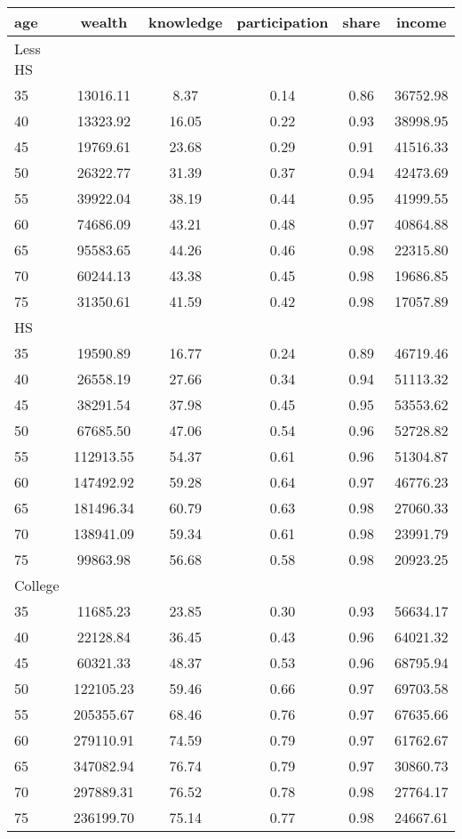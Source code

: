  \begin{tabular}{lccccc}
 \hline \hline
  age & wealth & knowledge & participation & share & income \\
 \hline
 Less HS & & & & & \\
 \hline
35 &  13016.11 &      8.37 &      0.14 &      0.86 &  36752.98 \\ 
40 &  13323.92 &     16.05 &      0.22 &      0.93 &  38998.95 \\ 
45 &  19769.61 &     23.68 &      0.29 &      0.91 &  41516.33 \\ 
50 &  26322.77 &     31.39 &      0.37 &      0.94 &  42473.69 \\ 
55 &  39922.04 &     38.19 &      0.44 &      0.95 &  41999.55 \\ 
60 &  74686.09 &     43.21 &      0.48 &      0.97 &  40864.88 \\ 
65 &  95583.65 &     44.26 &      0.46 &      0.98 &  22315.80 \\ 
70 &  60244.13 &     43.38 &      0.45 &      0.98 &  19686.85 \\ 
75 &  31350.61 &     41.59 &      0.42 &      0.98 &  17057.89 \\ 
 \hline
 HS & & & & & \\
 \hline
35 &  19590.89 &     16.77 &      0.24 &      0.89 &  46719.46 \\ 
40 &  26558.19 &     27.66 &      0.34 &      0.94 &  51113.32 \\ 
45 &  38291.54 &     37.98 &      0.45 &      0.95 &  53553.62 \\ 
50 &  67685.50 &     47.06 &      0.54 &      0.96 &  52728.82 \\ 
55 & 112913.55 &     54.37 &      0.61 &      0.96 &  51304.87 \\ 
60 & 147492.92 &     59.28 &      0.64 &      0.97 &  46776.23 \\ 
65 & 181496.34 &     60.79 &      0.63 &      0.98 &  27060.33 \\ 
70 & 138941.09 &     59.34 &      0.61 &      0.98 &  23991.79 \\ 
75 &  99863.98 &     56.68 &      0.58 &      0.98 &  20923.25 \\ 
 \hline
 College & & & & & \\
 \hline
35 &  11685.23 &     23.85 &      0.30 &      0.93 &  56634.17 \\ 
40 &  22128.84 &     36.45 &      0.43 &      0.96 &  64021.32 \\ 
45 &  60321.33 &     48.37 &      0.53 &      0.96 &  68795.94 \\ 
50 & 122105.23 &     59.46 &      0.66 &      0.97 &  69703.58 \\ 
55 & 205355.67 &     68.46 &      0.76 &      0.97 &  67635.66 \\ 
60 & 279110.91 &     74.59 &      0.79 &      0.97 &  61762.67 \\ 
65 & 347082.94 &     76.74 &      0.79 &      0.97 &  30860.73 \\ 
70 & 297889.31 &     76.52 &      0.78 &      0.98 &  27764.17 \\ 
75 & 236199.70 &     75.14 &      0.77 &      0.98 &  24667.61 \\ 
 \hline \hline
 \end{tabular}
